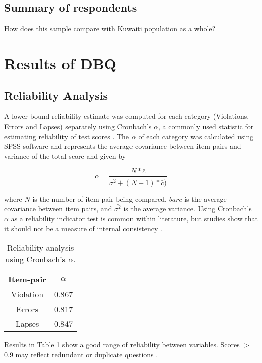 \documentclass[preprint,12pt,a4paper,authoryear]{elsarticle}
\begin{document}
\subsection{Summary of respondents}
How does this sample compare with Kuwaiti population as a whole? 

\section{Results of DBQ}

\subsection{Reliability Analysis}
A lower bound reliability estimate was computed for each category (Violations, Errors and Lapses) separately using Cronbach's $\alpha$,  a commonly used statistic for estimating reliability of test scores \citep{Warrens2014}. The $\alpha$ of each category was calculated using SPSS software and represents the average covariance between item-pairs and variance of the total score and given by

\begin{equation}
\label{eq:alpha}
\alpha = \frac{N*\bar{c}}{\bar{\sigma^{2}}+(N-1)*\bar{c})}
\end{equation}

\noindent
where $N$ is the number of item-pair being compared, $bar{c}$ is the average covariance between item pairs, and $\bar{\sigma^{2}}$ is the average variance. Using Cronbach's $\alpha$ as a reliability indicator test is common within literature, but studies show that it should not be a measure of internal consistency \citep{Sijtsma2009, Tavokol2011}.

\begin{table}[H]
\centering
\caption{Reliability analysis using Cronbach's $\alpha$.}
\label{tab:alpha}
\begin{tabular}{@{}cc@{}}
\toprule
\textbf{Item-pair} & \textbf{$\alpha$} \\ \midrule
Violation & 0.867 \\
Errors & 0.817 \\
Lapses & 0.847 \\ \bottomrule
\end{tabular}
\end{table} 

Results in Table \ref{tab:alpha} show a good range of reliability between variables. Scores $>$ 0.9 may reflect redundant or duplicate questions \citep{Streiner2003}.
\end{document}
